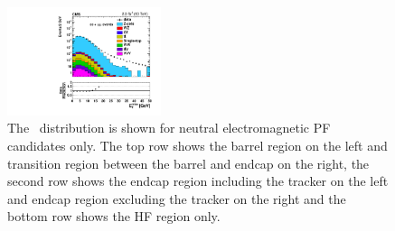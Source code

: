 \begin{figure}[!ht]
\begin{center}
\begin{tabular}{cc}
    \end{tabular}
    \includegraphics[width=0.4\textwidth]{MET/figs/h_met_phpfcands_30in_pt_ll_signalregion_inclusive_passtrig.pdf} 
    \caption{The \MET\ distribution is shown for neutral electromagnetic PF candidates only.
      The top row shows the barrel region on the left and transition region between the barrel and endcap on the right,
      the second row shows the endcap region including the tracker on the left and endcap region excluding the tracker on the right
      and the bottom row shows the HF region only.
      \label{fig:phpfcands}
    }
  \end{center}
\end{figure}

